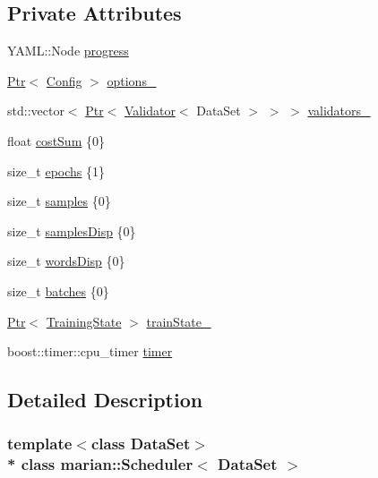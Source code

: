 \subsection*{Private Attributes}
\begin{DoxyCompactItemize}
\item 
Y\+A\+M\+L\+::\+Node \hyperlink{classmarian_1_1Scheduler_ae3fc3dd391d460a070c88a133997d187}{progress}
\item 
\hyperlink{namespacemarian_ad1a373be43a00ef9ce35666145137b08}{Ptr}$<$ \hyperlink{classmarian_1_1Config}{Config} $>$ \hyperlink{classmarian_1_1Scheduler_a82aeb8a4ec08a364bec7c6aac6a25e01}{options\+\_\+}
\item 
std\+::vector$<$ \hyperlink{namespacemarian_ad1a373be43a00ef9ce35666145137b08}{Ptr}$<$ \hyperlink{classmarian_1_1Validator}{Validator}$<$ Data\+Set $>$ $>$ $>$ \hyperlink{classmarian_1_1Scheduler_aaaad6769ded3ed1fa5e307cde44fecdf}{validators\+\_\+}
\item 
float \hyperlink{classmarian_1_1Scheduler_a277799516747fa7de995c0502b1ca481}{cost\+Sum} \{0\}
\item 
size\+\_\+t \hyperlink{classmarian_1_1Scheduler_af63f13e7b7219211e9b1e353f36000fa}{epochs} \{1\}
\item 
size\+\_\+t \hyperlink{classmarian_1_1Scheduler_aa04e56213d32a491b15a9abdafe7ee94}{samples} \{0\}
\item 
size\+\_\+t \hyperlink{classmarian_1_1Scheduler_a766d4b314a640dcdd36405887217d262}{samples\+Disp} \{0\}
\item 
size\+\_\+t \hyperlink{classmarian_1_1Scheduler_a2609c2386b4afc3eb67c10e0da7ce975}{words\+Disp} \{0\}
\item 
size\+\_\+t \hyperlink{classmarian_1_1Scheduler_a3a226357e546863179c3b635dd10de39}{batches} \{0\}
\item 
\hyperlink{namespacemarian_ad1a373be43a00ef9ce35666145137b08}{Ptr}$<$ \hyperlink{classmarian_1_1TrainingState}{Training\+State} $>$ \hyperlink{classmarian_1_1Scheduler_adfe60998ce4ead7e9c0e6f7ff65a7ec7}{train\+State\+\_\+}
\item 
boost\+::timer\+::cpu\+\_\+timer \hyperlink{classmarian_1_1Scheduler_a67aa9ed4773be96d9490ffce8ba663d6}{timer}
\end{DoxyCompactItemize}


\subsection{Detailed Description}
\subsubsection*{template$<$class Data\+Set$>$\\*
class marian\+::\+Scheduler$<$ Data\+Set $>$}



